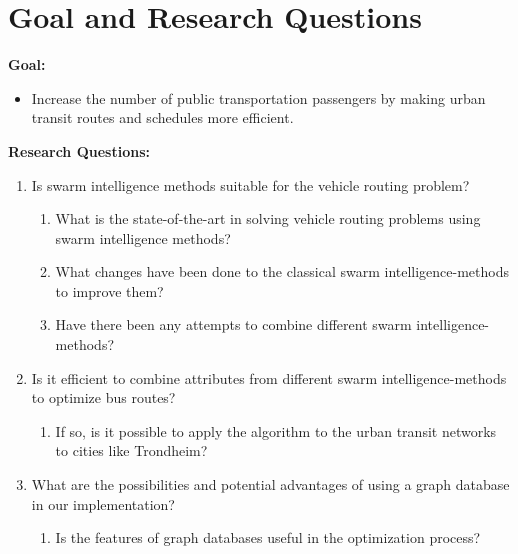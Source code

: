 \section{Goal and Research Questions}
\textbf{Goal:}
\begin{itemize}
\item \label{itm:goal} Increase the number of public transportation passengers by making urban transit routes and schedules more efficient.
\end{itemize}
\textbf{Research Questions:}
\begin{enumerate}
  \item Is swarm intelligence methods suitable for the vehicle routing problem?
    \begin{enumerate}
    \item What is the state-of-the-art in solving vehicle routing problems using swarm intelligence methods?
    \item What changes have been done to the classical swarm intelligence-methods to improve them?
    \item Have there been any attempts to combine different swarm intelligence-methods?
  \end{enumerate}
 
\item Is it efficient to combine attributes from different swarm intelligence-methods to optimize bus routes?
    \begin{enumerate}
    \item If so, is it possible to apply the algorithm to the urban transit networks to cities like Trondheim?
  \end{enumerate}

\item What are the possibilities and potential advantages of using a graph database in our implementation?
\begin{enumerate}
\item Is the features of graph databases useful in the optimization process? 
\end{enumerate}
\end{enumerate}